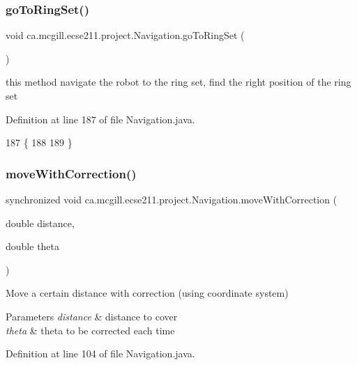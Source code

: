 \subsubsection{\texorpdfstring{go\+To\+Ring\+Set()}{goToRingSet()}}
{\footnotesize\ttfamily void ca.\+mcgill.\+ecse211.\+project.\+Navigation.\+go\+To\+Ring\+Set (\begin{DoxyParamCaption}{ }\end{DoxyParamCaption})}

this method navigate the robot to the ring set, find the right position of the ring set 

Definition at line 187 of file Navigation.\+java.


\begin{DoxyCode}
187                             \{
188     
189   \}
\end{DoxyCode}
\mbox{\label{classca_1_1mcgill_1_1ecse211_1_1project_1_1_navigation_a48eeb9ae2da23664421e8da5642054c7}} 
\subsubsection{\texorpdfstring{move\+With\+Correction()}{moveWithCorrection()}}
{\footnotesize\ttfamily synchronized void ca.\+mcgill.\+ecse211.\+project.\+Navigation.\+move\+With\+Correction (\begin{DoxyParamCaption}\item[{double}]{distance,  }\item[{double}]{theta }\end{DoxyParamCaption})}

Move a certain distance with correction (using coordinate system) 
\begin{DoxyParams}{Parameters}
{\em distance} & distance to cover \\
\hline
{\em theta} & theta to be corrected each time \\
\hline
\end{DoxyParams}


Definition at line 104 of file Navigation.\+java.


